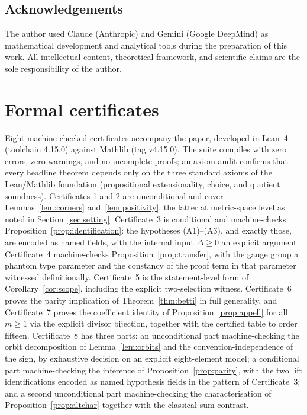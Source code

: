 \documentclass[11pt,a4paper]{article}
\theoremstyle{plain}
\theoremstyle{definition}
\theoremstyle{remark}
\begin{document}
\subsection*{Acknowledgements}

The author used Claude (Anthropic) and Gemini (Google DeepMind) as mathematical development and analytical tools during the preparation of this work. All intellectual content, theoretical framework, and scientific claims are the sole responsibility of the author.

\appendix
\section{Formal certificates}\label{app:lean}

Eight machine-checked certificates accompany the paper, developed in Lean~4 (toolchain 4.15.0) against Mathlib (tag v4.15.0). The suite compiles with zero errors, zero warnings, and no incomplete proofs; an axiom audit confirms that every headline theorem depends only on the three standard axioms of the Lean/Mathlib foundation (propositional extensionality, choice, and quotient soundness). Certificates 1 and 2 are unconditional and cover Lemmas~\ref{lem:corners} and~\ref{lem:positivity}, the latter at metric-space level as noted in Section~\ref{sec:setting}. Certificate~3 is conditional and machine-checks Proposition~\ref{prop:identification}: the hypotheses (A1)--(A3), and exactly those, are encoded as named fields, with the internal input $\Delta \ge 0$ an explicit argument. Certificate~4 machine-checks Proposition~\ref{prop:transfer}, with the gauge group a phantom type parameter and the constancy of the proof term in that parameter witnessed definitionally. Certificate~5 is the statement-level form of Corollary~\ref{cor:scope}, including the explicit two-selection witness. Certificate~6 proves the parity implication of Theorem~\ref{thm:betti} in full generality, and Certificate~7 proves the coefficient identity of Proposition~\ref{prop:appell} for all $m \ge 1$ via the explicit divisor bijection, together with the certified table to order fifteen. Certificate~8 has three parts: an unconditional part machine-checking the orbit decomposition of Lemma~\ref{lem:orbits} and the convention-independence of the sign, by exhaustive decision on an explicit eight-element model; a conditional part machine-checking the inference of Proposition~\ref{prop:parity}, with the two lift identifications encoded as named hypothesis fields in the pattern of Certificate~3; and a second unconditional part machine-checking the characterisation of Proposition~\ref{prop:altchar} together with the classical-sum contrast.
\end{document}
